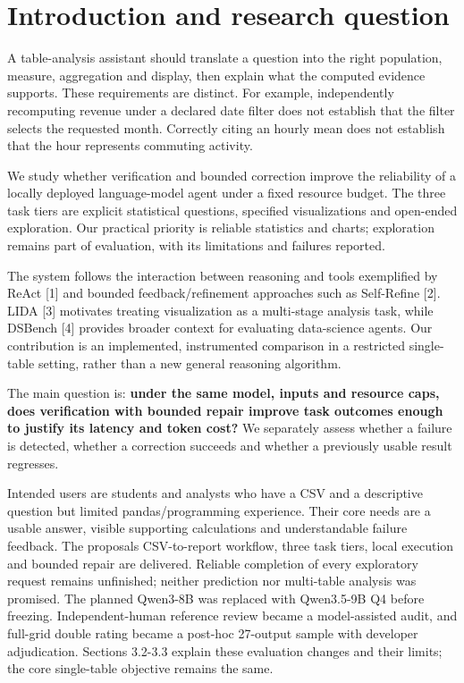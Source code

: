\section{Introduction and research question}\label{introduction-and-research-question}

A table-analysis assistant should translate a question into the right population, measure, aggregation and display, then explain what the computed evidence supports. These requirements are distinct. For example, independently recomputing revenue under a declared date filter does not establish that the filter selects the requested month. Correctly citing an hourly mean does not establish that the hour represents commuting activity.

We study whether verification and bounded correction improve the reliability of a locally deployed language-model agent under a fixed resource budget. The three task tiers are explicit statistical questions, specified visualizations and open-ended exploration. Our practical priority is reliable statistics and charts; exploration remains part of evaluation, with its limitations and failures reported.

The system follows the interaction between reasoning and tools exemplified by ReAct {[}1{]} and bounded feedback/refinement approaches such as Self-Refine {[}2{]}. LIDA {[}3{]} motivates treating visualization as a multi-stage analysis task, while DSBench {[}4{]} provides broader context for evaluating data-science agents. Our contribution is an implemented, instrumented comparison in a restricted single-table setting, rather than a new general reasoning algorithm.

The main question is: \textbf{under the same model, inputs and resource caps, does verification with bounded repair improve task outcomes enough to justify its latency and token cost?} We separately assess whether a failure is detected, whether a correction succeeds and whether a previously usable result regresses.

Intended users are students and analysts who have a CSV and a descriptive question but limited pandas/programming experience. Their core needs are a usable answer, visible supporting calculations and understandable failure feedback. The proposal\textquotesingle s CSV-to-report workflow, three task tiers, local execution and bounded repair are delivered. Reliable completion of every exploratory request remains unfinished; neither prediction nor multi-table analysis was promised. The planned Qwen3-8B was replaced with Qwen3.5-9B Q4 before freezing. Independent-human reference review became a model-assisted audit, and full-grid double rating became a post-hoc 27-output sample with developer adjudication. Sections 3.2-3.3 explain these evaluation changes and their limits; the core single-table objective remains the same.

